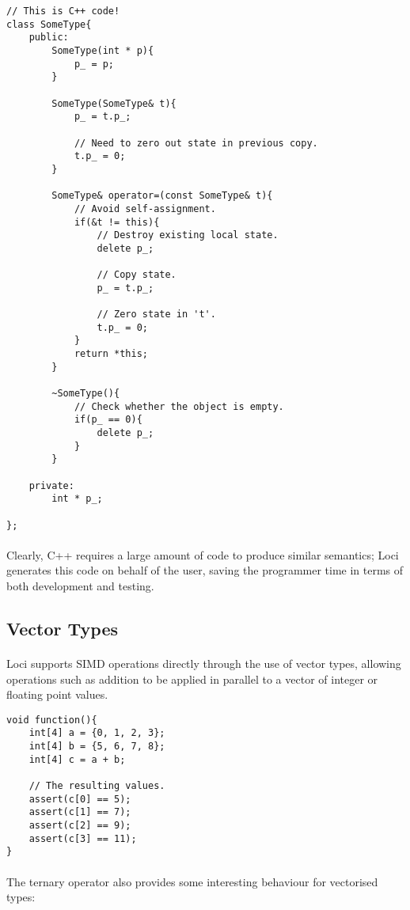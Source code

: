 \documentclass[12pt,twoside,notitlepage]{report}
\begin{document}
\begin{lstlisting}
// This is C++ code!
class SomeType{
	public:
		SomeType(int * p){
			p_ = p;
		}
		
		SomeType(SomeType& t){
			p_ = t.p_;
			
			// Need to zero out state in previous copy.
			t.p_ = 0;
		}
		
		SomeType& operator=(const SomeType& t){
			// Avoid self-assignment.
			if(&t != this){
				// Destroy existing local state.
				delete p_;
				
				// Copy state.
				p_ = t.p_;
				
				// Zero state in 't'.
				t.p_ = 0;
			}
			return *this;
		}
		
		~SomeType(){
			// Check whether the object is empty.
			if(p_ == 0){
				delete p_;
			}
		}
	
	private:
		int * p_;
	
};
\end{lstlisting}


\paragraph{}
Clearly, C++ requires a large amount of code to produce similar semantics; Loci generates this code on behalf of the user, saving the programmer time in terms of both development and testing.

\clearpage

\subsection{Vector Types}

\paragraph{}
Loci supports SIMD operations directly through the use of vector types, allowing operations such as addition to be applied in parallel to a vector of integer or floating point values.


\begin{lstlisting}
void function(){
	int[4] a = {0, 1, 2, 3};
	int[4] b = {5, 6, 7, 8};
	int[4] c = a + b;
	
	// The resulting values.
	assert(c[0] == 5);
	assert(c[1] == 7);
	assert(c[2] == 9);
	assert(c[3] == 11);
}
\end{lstlisting}


\paragraph{}
The ternary operator also provides some interesting behaviour for vectorised types:
\end{document}
